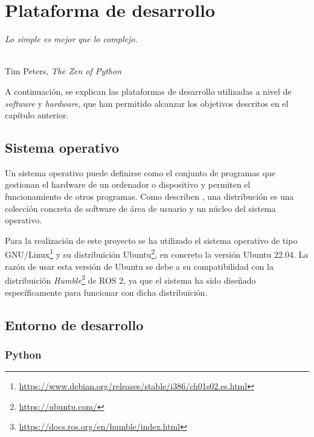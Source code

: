 \chapter{Plataforma de desarrollo}
\label{cap:capitulo3}

\begin{flushright}
\begin{minipage}[]{6.5cm}
\emph{Lo simple es mejor que lo complejo.}\\
\end{minipage}\\

Tim Peters, \textit{The Zen of Python}\\
\end{flushright}

\vspace{1cm}
\setcounter{footnote}{1}

A continuación, se explican las plataformas de desarrollo utilizadas a nivel de \textit{software} y \textit{hardware}, que han permitido alcanzar los objetivos descritos en el capítulo anterior.

\section{Sistema operativo}
\label{sec:distribuicion}

Un sistema operativo puede definirse como el conjunto de programas que gestionan el hardware de un ordenador o dispositivo y permiten el funcionamiento de otros programas.
Como describen \cite{perales9a}, una distribución es una colección concreta de software de área de usuario y un núcleo del sistema operativo.

Para la realización de este proyecto se ha utilizado el sistema operativo de tipo GNU/Linux\footnote{\url{https://www.debian.org/releases/stable/i386/ch01s02.es.html}} y su distribuición Ubuntu\footnote{\url{https://ubuntu.com/}}, en concreto la versión Ubuntu 22.04.
La razón de usar esta versión de Ubuntu se debe a su compatibilidad con la distribuición \textit{Humble}\footnote{\url{https://docs.ros.org/en/humble/index.html}} de ROS 2, ya que el sistema ha sido diseñado específicamente para funcionar con dicha distribuición.

\section{Entorno de desarrollo}
\label{sec:entornos}

\subsection{Python}
\label{sec:entornos}

